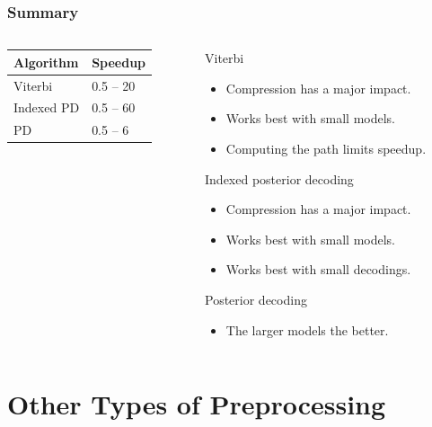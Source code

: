 \documentclass[english,notes]{beamer}
\begin{document}
\begin{frame}
  \frametitle{Summary}
  \begin{columns}
    \begin{column}{0.4\textwidth}
      \begin{table}
        \centering
        \begin{tabular}{ll}
          \toprule
          Algorithm & Speedup \\
          \midrule
          Viterbi & 0.5 -- 20\\
          Indexed PD & 0.5 -- 60\\
          PD & 0.5 -- 6\\
          \bottomrule
        \end{tabular}
      \end{table}
    \end{column}\pause%
    \begin{column}{0.6\textwidth}
      \begin{block}{Viterbi}
        \begin{itemize}
        \item Compression has a major impact.
        \item Works best with small models.
        \item Computing the path limits speedup.
        \end{itemize}
      \end{block}
      \begin{block}{Indexed posterior decoding}
        \begin{itemize}
        \item Compression has a major impact.
        \item Works best with small models.
        \item Works best with small decodings.
        \end{itemize}
      \end{block}
      \begin{block}{Posterior decoding}
        \begin{itemize}
        \item The larger models the better.
        \end{itemize}
      \end{block}
    \end{column}
  \end{columns}
\end{frame}

\section{Other Types of Preprocessing}
\end{document}
